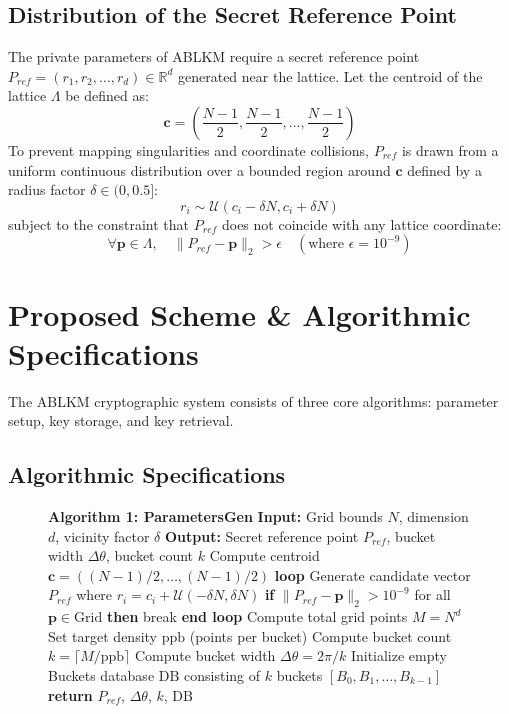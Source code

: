 \documentclass[conference,a4paper]{IEEEtran}
\begin{document}
\subsection{Distribution of the Secret Reference Point}
The private parameters of ABLKM require a secret reference point $P_{ref} = (r_1, r_2, \dots, r_d) \in \mathbb{R}^d$ generated near the lattice. Let the centroid of the lattice $\Lambda$ be defined as:
\begin{equation}
\mathbf{c} = \left(\frac{N-1}{2}, \frac{N-1}{2}, \dots, \frac{N-1}{2}\right)
\end{equation}
To prevent mapping singularities and coordinate collisions, $P_{ref}$ is drawn from a uniform continuous distribution over a bounded region around $\mathbf{c}$ defined by a radius factor $\delta \in (0, 0.5]$:
\begin{equation}
r_i \sim \mathcal{U}(c_i - \delta N, c_i + \delta N)
\end{equation}
subject to the constraint that $P_{ref}$ does not coincide with any lattice coordinate:
\begin{equation}
\forall \mathbf{p} \in \Lambda, \quad \|P_{ref} - \mathbf{p}\|_2 > \epsilon \quad (\text{where } \epsilon = 10^{-9})
\end{equation}

\section{Proposed Scheme \& Algorithmic Specifications}
The ABLKM cryptographic system consists of three core algorithms: parameter setup, key storage, and key retrieval.

\subsection{Algorithmic Specifications}

\begin{figure}[!ht]
\centering
\begin{minipage}{\linewidth}
\begin{algorithmic}[1]
\STATE \textbf{Algorithm 1: ParametersGen}
\STATE \textbf{Input:} Grid bounds $N$, dimension $d$, vicinity factor $\delta$
\STATE \textbf{Output:} Secret reference point $P_{ref}$, bucket width $\Delta\theta$, bucket count $k$
\STATE Compute centroid $\mathbf{c} = ((N - 1)/2, \dots, (N - 1)/2)$
\STATE \textbf{loop}
\STATE \quad Generate candidate vector $P_{ref}$ where $r_i = c_i + \mathcal{U}(-\delta N, \delta N)$
\STATE \quad \textbf{if} $\|P_{ref} - \mathbf{p}\|_2 > 10^{-9}$ for all $\mathbf{p} \in \text{Grid}$ \textbf{then} break
\STATE \textbf{end loop}
\STATE Compute total grid points $M = N^d$
\STATE Set target density $\text{ppb}$ (points per bucket)
\STATE Compute bucket count $k = \lceil M / \text{ppb} \rceil$
\STATE Compute bucket width $\Delta\theta = 2\pi / k$
\STATE Initialize empty Buckets database $\text{DB}$ consisting of $k$ buckets $[B_0, B_1, \dots, B_{k-1}]$
\STATE \textbf{return} $P_{ref}$, $\Delta\theta$, $k$, $\text{DB}$
\end{algorithmic}
\end{minipage}
\end{figure}
\end{document}
